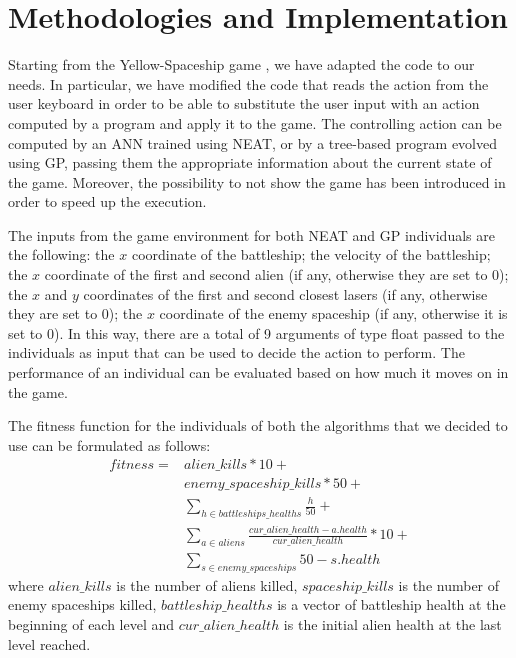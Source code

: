 \section{Methodologies and Implementation}
Starting from the Yellow-Spaceship game \cite{Yellow-Spaceship}, we have adapted the code to our needs.
In particular, we have modified the code that reads the action from the user keyboard in order to be
able to substitute the user input with an action computed by a program and apply it to the game.
The controlling action can be computed by an ANN trained using NEAT, or by a tree-based program evolved 
using GP, passing them the appropriate information about the current state of the game.
Moreover, the possibility to not show the game has been introduced in order to speed up the execution.

The inputs from the game environment for both NEAT and GP individuals are the following:
the $x$ coordinate of the battleship; the velocity of the battleship;
the $x$ coordinate of the first and second alien (if any, otherwise they are set to 0);
the $x$ and $y$ coordinates of the first and second closest lasers (if any, otherwise they are set to 0);
the $x$ coordinate of the enemy spaceship (if any, otherwise it is set to 0).
In this way, there are a total of 9 arguments of type float passed to the individuals as input that
can be used to decide the action to perform. 
The performance of an individual can be evaluated based on how much it moves on in the game.

The fitness function for the individuals of both the algorithms that we decided to use can be
formulated as follows:
\begin{equation}
\begin{split}
    fitness = & alien\_kills * 10 + \\
              & enemy\_spaceship\_kills * 50 + \\
              & \sum_{h \in battleships\_healths}^{} \frac{h}{50} + \\
              & \sum_{a \in aliens}^{} \frac{cur\_alien\_health - a.health}{cur\_alien\_health} * 10 + \\
              & \sum_{s \in enemy\_spaceships}^{} 50 - s.health
\end{split}
\end{equation}
where $alien\_kills$ is the number of aliens killed, 
$spaceship\_kills$ is the number of enemy spaceships killed,
$battleship\_healths$ is a vector of battleship health at the beginning of each level and
$cur\_alien\_health$ is the initial alien health at the last level reached. 


